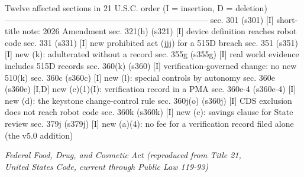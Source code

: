 \begin{asciifig}
Twelve affected sections in 21 U.S.C. order (I = insertion, D = deletion)
--------------------------------------------------------------------------
  sec. 301     (s301)     [I]   short-title note: 2026 Amendment
  sec. 321(h)  (s321)     [I]   device definition reaches robot code
  sec. 331     (s331)     [I]   new prohibited act (jjj) for a 515D breach
  sec. 351     (s351)     [I]   new (k): adulterated without a record
  sec. 355g    (s355g)    [I]   real world evidence includes 515D records
  sec. 360(k)  (s360)     [I]   verification-governed change: no new 510(k)
  sec. 360c    (s360c)    [I]   new (l): special controls by autonomy
  sec. 360e    (s360e)    [I,D] new (c)(1)(I): verification record in a PMA
  sec. 360e-4  (s360e-4)  [I]   new (d): the keystone change-control rule
  sec. 360j(o) (s360j)    [I]   CDS exclusion does not reach robot code
  sec. 360k    (s360k)    [I]   new (c): savings clause for State review
  sec. 379j    (s379j)    [I]   new (a)(4): no fee for a verification
                                record filed alone (the v5.0 addition)
\end{asciifig}
\vspace{-0.5cm}

\clearpage

\begin{center}\small\itshape Federal Food, Drug, and Cosmetic Act (reproduced from
Title 21,\\United States Code, current through Public Law 119-93)\end{center}



\begin{center}\small *\quad *\quad *\quad *\quad *\quad *\quad *\end{center}




